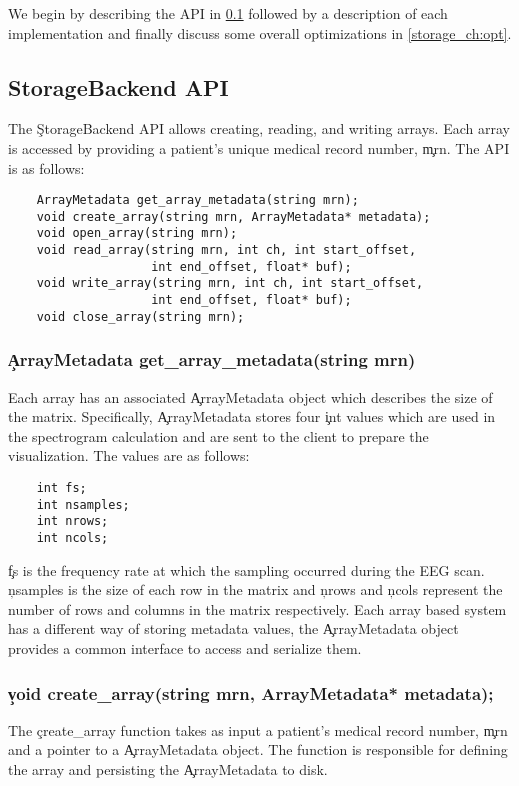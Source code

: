We begin by describing the API in \ref{storage_ch:api} followed by a description of
each implementation and finally discuss some overall optimizations in
\ref{storage_ch:opt}.

\subsection{StorageBackend API}\label{storage_ch:api}

The \c{StorageBackend} API allows creating, reading, and writing arrays. Each
array is accessed by providing a patient's unique medical record number,
\c{mrn}. The API is as follows:

\begin{lstlisting}
    ArrayMetadata get_array_metadata(string mrn);
    void create_array(string mrn, ArrayMetadata* metadata);
    void open_array(string mrn);
    void read_array(string mrn, int ch, int start_offset,
                    int end_offset, float* buf);
    void write_array(string mrn, int ch, int start_offset,
                    int end_offset, float* buf);
    void close_array(string mrn);
\end{lstlisting}

\subsubsection{\c{ArrayMetadata get\_array\_metadata(string mrn)}}
Each array has an associated \c{ArrayMetadata} object which describes the size
of the matrix. Specifically, \c{ArrayMetadata} stores four \c{int} values which
are used in the spectrogram calculation and are sent to the client to prepare
the visualization. The values are as follows:

\begin{lstlisting}
    int fs;
    int nsamples;
    int nrows;
    int ncols;
\end{lstlisting}

\c{fs} is the frequency rate at which the sampling occurred during the EEG
scan. \c{nsamples} is the size of each row in the matrix and \c{nrows} and
\c{ncols} represent the number of rows and columns in the matrix respectively.
Each array based system has a different way of storing metadata values, the
\c{ArrayMetadata} object provides a common interface to access and serialize them.

\subsubsection{\c{void create\_array(string mrn, ArrayMetadata* metadata);}}
The \c{create\_array} function takes as input a patient's medical record
number, \c{mrn} and a pointer to a \c{ArrayMetadata} object. The function is
responsible for defining the array and persisting the \c{ArrayMetadata} to
disk.


